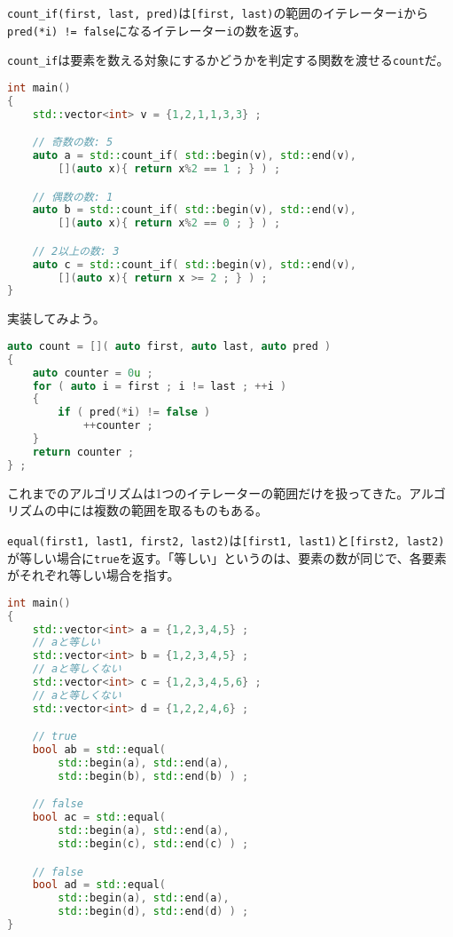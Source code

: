 \texttt{count\_if(first, last, pred)}は\texttt{[first, last)}の範囲のイテレーター\texttt{i}から\texttt{pred(*i) != false}になるイテレーター\texttt{i}の数を返す。

\texttt{count\_if}は要素を数える対象にするかどうかを判定する関数を渡せる\texttt{count}だ。

\ifTombow\pagebreak\fi
\begin{lstlisting}[language={C++}]
int main()
{
    std::vector<int> v = {1,2,1,1,3,3} ;

    // 奇数の数: 5
    auto a = std::count_if( std::begin(v), std::end(v),
        [](auto x){ return x%2 == 1 ; } ) ;

    // 偶数の数: 1
    auto b = std::count_if( std::begin(v), std::end(v),
        [](auto x){ return x%2 == 0 ; } ) ;

    // 2以上の数: 3
    auto c = std::count_if( std::begin(v), std::end(v),
        [](auto x){ return x >= 2 ; } ) ;
}
\end{lstlisting}

実装してみよう。

\begin{lstlisting}[language={C++}]
auto count = []( auto first, auto last, auto pred )
{
    auto counter = 0u ;
    for ( auto i = first ; i != last ; ++i )
    {
        if ( pred(*i) != false )
            ++counter ;  
    }
    return counter ;
} ;
\end{lstlisting}


これまでのアルゴリズムは1つのイテレーターの範囲だけを扱ってきた。アルゴリズムの中には複数の範囲を取るものもある。

\texttt{equal(first1, last1, first2, last2)}は\texttt{[first1, last1)}と\texttt{[first2, last2)}が等しい場合に\texttt{true}を返す。「等しい」というのは、要素の数が同じで、各要素がそれぞれ等しい場合を指す。

\begin{lstlisting}[language={C++}]
int main()
{
    std::vector<int> a = {1,2,3,4,5} ;
    // aと等しい
    std::vector<int> b = {1,2,3,4,5} ;
    // aと等しくない
    std::vector<int> c = {1,2,3,4,5,6} ;
    // aと等しくない
    std::vector<int> d = {1,2,2,4,6} ;

    // true
    bool ab = std::equal(
        std::begin(a), std::end(a),
        std::begin(b), std::end(b) ) ;

    // false
    bool ac = std::equal(
        std::begin(a), std::end(a),
        std::begin(c), std::end(c) ) ;

    // false
    bool ad = std::equal(
        std::begin(a), std::end(a),
        std::begin(d), std::end(d) ) ;
}
\end{lstlisting}

